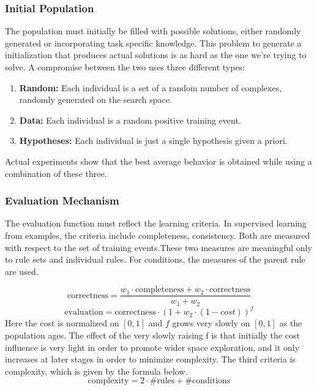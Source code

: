 \documentclass[../main.tex]{subfiles}
\begin{document}
\subsubsection{Initial Population}
The population must initially be filled with possible solutions, either randomly generated or incorporating task
specific knowledge. This problem to generate a initialization that produces actual solutions is as hard as the one
we're trying to solve. A compromise between the two uses three different types:

\begin{enumerate}
	\item \textbf{Random:} Each individual is a set of a random number of complexes, randomly generated on the search
	space.
	\item \textbf{Data:} Each individual is a random positive training event.
	\item \textbf{Hypotheses:} Each individual is just a single hypothesis given a priori.
\end{enumerate}

Actual experiments show that the best average behavior is obtained while using a combination of these three.

\subsubsection{Evaluation Mechanism}
The evaluation function must reflect the learning criteria. In supervised learning from examples, the criteria include
completeness, consistency. Both are measured with respect to the set of training events.These two measures are
meaningful only to rule sets and individual rules. For conditions, the measures of the parent rule are used.

\begin{equation}
\text{correctness} = \frac{w_1 \cdot \text{completeness} + w_2 \cdot \text{correctness}}{w_1 + w_2}
\end{equation}
\begin{equation}
	\text{evaluation} = \text{correctness} \cdot (1 + w_2 \cdot (1-cost))^f
\end{equation}
Here the cost is normalized on $[0,1]$ and $f$ grows very slowly on $[0,1]$ as the population ages. The effect of the
very slowly raising f is that initially the cost influence is very light in order to promote wider space exploration,
and it only increases at later stages in order to minimize complexity. The third criteria is complexity, which is given
by the formula below.
\begin{equation}
	\text{complexity} = 2 \cdot \text{\#rules} + \text{\#conditions}
\end{equation}
\end{document}

